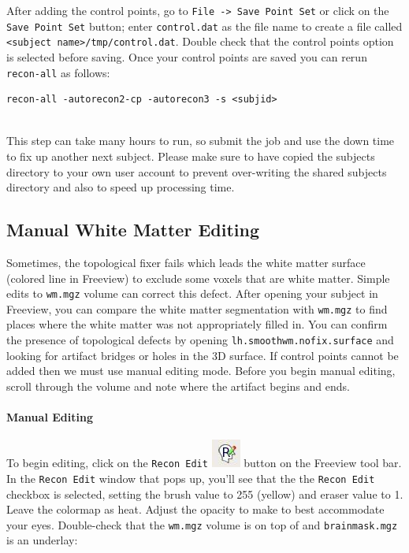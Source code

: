 \documentclass[paper=a4, fontsize=11pt]{scrartcl} %
\numberwithin{equation}{section} %
\numberwithin{figure}{section} %
\numberwithin{table}{section} %
\begin{document}
After adding the control points, go to \texttt{File -> Save Point Set} or click on the \texttt{Save Point Set} button; enter \texttt{control.dat} as the file name to create a file called \texttt{<subject name>/tmp/control.dat}. Double check that the control points option is selected before saving. Once your control points are saved you can rerun \texttt{recon-all} as follows:
~\\
\begin{lstlisting}[frame=single]
recon-all -autorecon2-cp -autorecon3 -s <subjid>
\end{lstlisting}


~\\ This step can take many hours to run, so submit the job and use the down time to fix up another next subject. Please make sure to have copied the subjects directory to your own user account to prevent over-writing the shared subjects directory and also to speed up processing time.
\subsection{Manual White Matter Editing}\label{ss:wse}  Sometimes, the topological fixer fails which leads the white matter surface (colored line in Freeview) to exclude some voxels that are white matter. Simple edits to \texttt{wm.mgz} volume can correct this defect.  After opening your subject in Freeview, you can compare the white matter segmentation with \texttt{wm.mgz} to find places where the white matter was not appropriately filled in.  You can confirm the presence of topological defects by opening \texttt{lh.smoothwm.nofix.surface} and looking for artifact bridges or holes in the 3D surface.  If control points cannot be added then we must use manual editing mode.  Before you begin manual editing, scroll through the volume and note where the artifact begins and ends.
\paragraph{Manual Editing}To begin editing, click on the \texttt{Recon Edit} \includegraphics{reconedit.jpg} button on the Freeview tool bar. In the \texttt{Recon Edit} window that pops up, you'll see that the the \texttt{Recon Edit} checkbox is selected, setting the brush value to 255 (yellow) and eraser value to 1. Leave the colormap as heat. Adjust the opacity to make to best accommodate your eyes. Double-check that the \texttt{wm.mgz} volume is on top of and \texttt{brainmask.mgz} is an underlay:  
\end{document}
